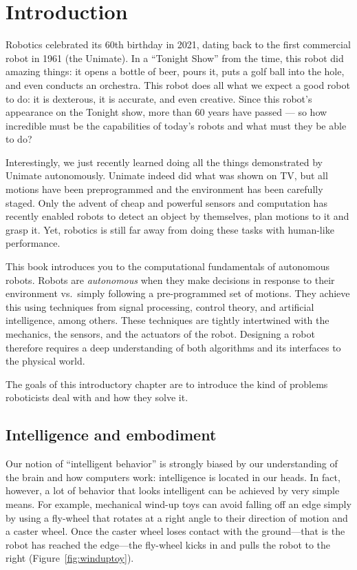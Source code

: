 \chapter{Introduction}\label{chap:introduction}
Robotics celebrated its 60th birthday in 2021, dating back to the first commercial robot in 1961 (the Unimate). In a ``Tonight Show'' from the time, this robot did amazing things: it opens a bottle of beer, pours it, puts a golf ball into the hole, and even conducts an orchestra. This robot does all what we expect a good robot to do: it is dexterous, it is accurate, and even creative. Since this robot's appearance on the Tonight show, more than 60 years have passed --- so how incredible must be the capabilities of today's robots and what must they be able to do?

Interestingly, we just recently learned doing all the things demonstrated by Unimate autonomously. Unimate indeed did what was shown on TV, but all motions have been preprogrammed and the environment has been carefully staged.  Only the advent of cheap and powerful sensors and computation has recently enabled robots to detect an object by themselves, plan motions to it and grasp it. Yet, robotics is still far away from doing these tasks with human-like performance.

This book introduces you to the computational fundamentals of autonomous robots. Robots are \emph{autonomous} when they make decisions in response to their environment vs.\ simply following a pre-programmed set of motions. They achieve this using techniques from signal processing, control theory, and artificial intelligence, among others. These techniques are tightly intertwined  with the mechanics, the sensors, and the actuators of the robot. Designing a robot therefore requires a deep understanding of both algorithms and its interfaces to the physical world.

The goals of this introductory chapter are to introduce the kind of problems roboticists deal with and how they solve it.

\section{Intelligence and embodiment}
Our notion of ``intelligent behavior'' is strongly biased by our understanding of the brain and how computers work: intelligence is located in our heads. In fact, however, a lot of behavior that looks intelligent can be achieved by very simple means. For example, mechanical wind-up toys can avoid falling off an edge simply by using a fly-wheel that rotates at a right angle to their direction of motion and a caster wheel. Once the caster wheel loses contact with the ground---that is the robot has reached the edge---the fly-wheel kicks in and pulls the robot to the right (Figure~\ref{fig:winduptoy}).

